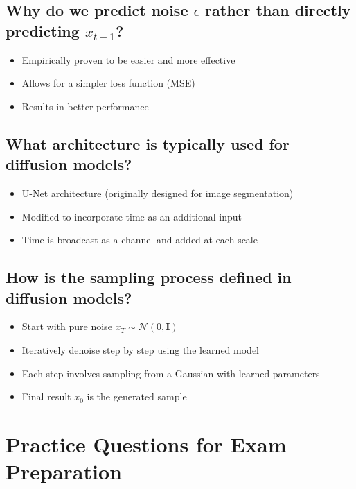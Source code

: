 \subsection*{Why do we predict noise $\epsilon$ rather than directly predicting $x_{t-1}$?}
\begin{itemize}
    \item Empirically proven to be easier and more effective
    \item Allows for a simpler loss function (MSE)
    \item Results in better performance
\end{itemize}

\subsection*{What architecture is typically used for diffusion models?}
\begin{itemize}
    \item U-Net architecture (originally designed for image segmentation)
    \item Modified to incorporate time as an additional input
    \item Time is broadcast as a channel and added at each scale
\end{itemize}

\subsection*{How is the sampling process defined in diffusion models?}
\begin{itemize}
    \item Start with pure noise $x_T \sim \mathcal{N}(0, \mathbf{I})$
    \item Iteratively denoise step by step using the learned model
    \item Each step involves sampling from a Gaussian with learned parameters
    \item Final result $x_0$ is the generated sample
\end{itemize}


\section{Practice Questions for Exam Preparation}

